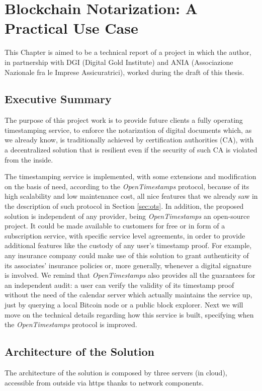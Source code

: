 \chapter{Blockchain Notarization: A Practical Use Case}
\label{chpr:project}
This Chapter is aimed to be a technical report of a project in which the author, in partnership with DGI (Digital Gold Institute) and ANIA (Associazione Nazionale fra le Imprese Assicuratrici), worked during the draft of this thesis.

\bigskip
\section{Executive Summary}
The purpose of this project work is to provide future clients a fully operating timestamping service, to enforce the notarization of digital documents which, as we already know, is traditionally achieved by certification authorities (CA), with a decentralized solution that is resilient even if the security of such CA is violated from the inside.

\bigskip
\noindent
The timestamping service is implemented, with some extensions and modification on the basis of need, according to the \textit{OpenTimestamps} protocol, because of its high scalability and low maintenance cost, all nice features that we already saw in the description of such protocol in Section \ref{sec:ots}. In addition, the proposed solution is independent of any provider, being \textit{OpenTimestamps} an open-source project. It could be made available to customers for free or in form of a subscription service, with specific service level agreements, in order to provide additional features like the custody of any user's timestamp proof. For example, any insurance company could make use of this solution to grant authenticity of its associates' insurance policies or, more generally, whenever a digital signature is involved. We remind that \textit{OpenTimestamps} also provides all the guarantees for an independent audit: a user can verify the validity of its timestamp proof without the need of the calendar server which actually maintains the service up, just by querying a local Bitcoin node or a public block explorer. Next we will move on the technical details regarding how this service is built, specifying when the \textit{OpenTimestamps} protocol is improved.

\bigskip
\section{Architecture of the Solution}
The architecture of the solution is composed by three servers (in cloud), accessible from outside via https thanks to network components.

